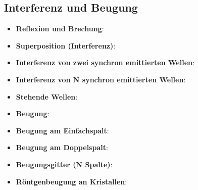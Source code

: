 \subsection{Interferenz und Beugung}%
\label{schwellen:sub:interferenz_und_beugung}

\begin{itemize}
	\item \textbf{Reflexion und Brechung}:
	\item \textbf{Superposition (Interferenz)}:
	\item \textbf{Interferenz von zwei synchron emittierten Wellen}:
	\item \textbf{Interferenz von N synchron emittierten Wellen}:
	\item \textbf{Stehende Wellen}:
	\item \textbf{Beugung}:
	\item \textbf{Beugung am Einfachspalt}:
	\item \textbf{Beugung am Doppelspalt}:
	\item \textbf{Beugungsgitter (N Spalte)}:
	\item \textbf{Röntgenbeugung an Kristallen}:
\end{itemize}